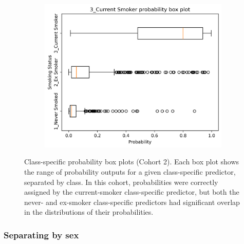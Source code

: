 \documentclass{article} %
\begin{document}
\begin{figure}[htb]
\begin{subfigure}{0.48\linewidth}
        \centering
        \includegraphics[width=\linewidth]{cohort2/test_boxplot_3.png}
    \end{subfigure}
    \caption[Class-specific probability box plots (Cohort 2)]{Class-specific probability box plots (Cohort 2). Each box plot shows the range of probability outputs for a given class-specific predictor, separated by class. In this cohort, probabilities were correctly assigned by the current-smoker class-specific predictor, but both the never- and ex-smoker class-specific predictors had significant overlap in the distributions of their probabilities.}
    \label{fig:cohort2-boxplots}
\end{figure}

\subsubsection{Separating by sex}
\end{document}
